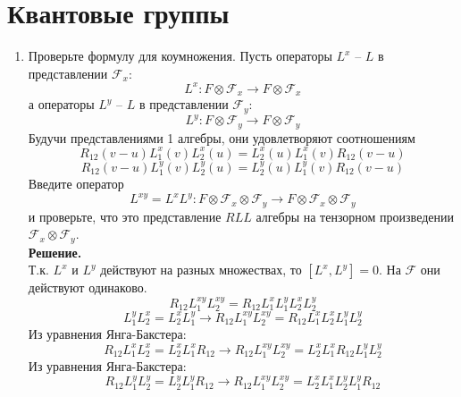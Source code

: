 \documentclass[12pt]{article}
\theoremstyle{definition}
\begin{document}
\section{Квантовые группы}
\begin{enumerate}
    \item Проверьте формулу для коумножения. Пусть операторы $L^x$ -- $L$ в представлении $\mathcal{F}_x$:
    \begin{equation}
        L^x:F\otimes\mathcal{F}_x\rightarrow F\otimes\mathcal{F}_x
    \end{equation}
    а операторы $L^y$ -- $L$ в представлении $\mathcal{F}_y$:
    \begin{equation}
        L^y:F\otimes\mathcal{F}_y\rightarrow F\otimes\mathcal{F}_y
    \end{equation}
    Будучи представлениями 1 алгебры, они удовлетворяют соотношениям
    \begin{equation}
        R_{12}(v-u)L^x_1(v)L^x_2(u)=L^x_2(u)L^x_1(v)R_{12}(v-u)
    \end{equation}
    \begin{equation}
        R_{12}(v-u)L^y_1(v)L^y_2(u)=L^y_2(u)L^y_1(v)R_{12}(v-u)
    \end{equation}
    Введите оператор
    \begin{equation}
        L^{xy}=L^xL^y:F\otimes\mathcal{F}_x\otimes\mathcal{F}_y\rightarrow F\otimes\mathcal{F}_x\otimes\mathcal{F}_y
    \end{equation}
    и проверьте, что это представление $RLL$ алгебры на тензорном произведении $\mathcal{F}_x\otimes\mathcal{F}_y$.\\
    \textbf{Решение.}\\
    Т.к. $L^x$ и $L^y$ действуют на разных множествах, то $[L^x,L^y]=0$. На $\mathcal{F}$ они действуют одинаково.
    \begin{equation}
        R_{12}L_1^{xy}L_2^{xy}=R_{12}L_1^xL_1^yL_2^xL_2^y
    \end{equation}
    \begin{equation}
        L^y_1L^x_2=L^x_2L^y_1\rightarrow R_{12}L_1^{xy}L_2^{xy}=R_{12}L_1^xL_2^xL_1^yL_2^y
    \end{equation}
    Из уравнения Янга-Бакстера:
    \begin{equation}
        R_{12}L^x_1L^x_2=L^x_2L^x_1R_{12}\rightarrow R_{12}L_1^{xy}L_2^{xy}=L^x_2L^x_1R_{12}L_1^yL_2^y
    \end{equation}
    Из уравнения Янга-Бакстера:
    \begin{equation}
        R_{12}L^y_1L^y_2=L^y_2L^y_1R_{12}\rightarrow R_{12}L_1^{xy}L_2^{xy}=L^x_2L^x_1L^y_2L^y_1R_{12}

\end{equation}
\end{enumerate}
\end{document}

